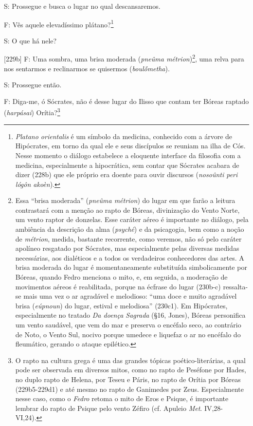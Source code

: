 S: Prossegue e busca o lugar no qual descansaremos.

F: Vês aquele elevadíssimo plátano?\footnote{\emph{Platano orientalis} é
  um símbolo da medicina, conhecido com a árvore de Hipócrates, em torno
  da qual ele e seus discípulos se reuniam na ilha de Cós. Nesse momento
  o diálogo estabelece a eloquente interface da filosofia com a
  medicina, especialmente a hipocrática, sem contar que Sócrates acabara
  de dizer (228b) que ele próprio era doente para ouvir discursos
  (\emph{nosoûnti peri lógôn akoèn}).}

S: O que há nele?

{[}229b{]} F: Uma sombra, uma brisa moderada (\emph{pneûma
métrion})\footnote{Essa ``brisa moderada'' (\emph{pneûma métrion}) do
  lugar em que farão a leitura contrastará com a menção ao rapto de
  Bóreas, divinização do Vento Norte, um vento raptor de donzelas. Esse
  caráter aéreo é importante no diálogo, pela ambiência da descrição da
  alma (\emph{psyché}) e da psicagogia, bem como a noção de
  \emph{métrion}, medida, bastante recorrente, como veremos, não só pelo
  caráter apolíneo resgatado por Sócrates, mas especialmente pelas
  diversas medidas necessárias, aos dialéticos e a todos os verdadeiros
  conhecedores das artes. A brisa moderada do lugar é momentaneamente
  substituída simbolicamente por Bóreas, quando Fedro menciona o mito,
  e, em seguida, a moderação de movimentos aéreos é reabilitada, porque
  na écfrase do lugar (230b-c) ressalta-se mais uma vez o ar agradável e
  melodioso: ``uma doce e muito agradável brisa (\emph{eúpnoun}) do
  lugar, estival e melodiosa'' (230c1). Em Hipócrates, especialmente no
  tratado \emph{Da doença Sagrada} (§16, Jones), Bóreas personifica um
  vento saudável, que vem do mar e preserva o encéfalo seco, ao
  contrário de Noto, o Vento Sul, nocivo porque umedece e liquefaz o ar
  no encéfalo do fleumático, gerando o ataque epilético.}, uma relva
para nos sentarmos e reclinarmos se quisermos (\emph{boulṓmetha}).

S: Prossegue então.

F: Diga-me, ó Sócrates, não é desse lugar do Ilisso que contam ter
Bóreas raptado (\emph{harpásai}) Orítia?\footnote{O rapto na cultura
  grega é uma das grandes tópicas poético-literárias, a qual pode ser
  observada em diversos mitos, como no rapto de Peséfone por Hades, no
  duplo rapto de Helena, por Teseu e Páris, no rapto de Orítia por
  Bóreas (229b5-229d1) e até mesmo no rapto de Ganimedes por Zeus.
  Especialmente nesse caso, como o \emph{Fedro} retoma o mito de Eros e
  Psique, é importante lembrar do rapto de Psique pelo vento Zéfiro (cf.
  Apuleio \emph{Met}. IV,28-VI,24).}

